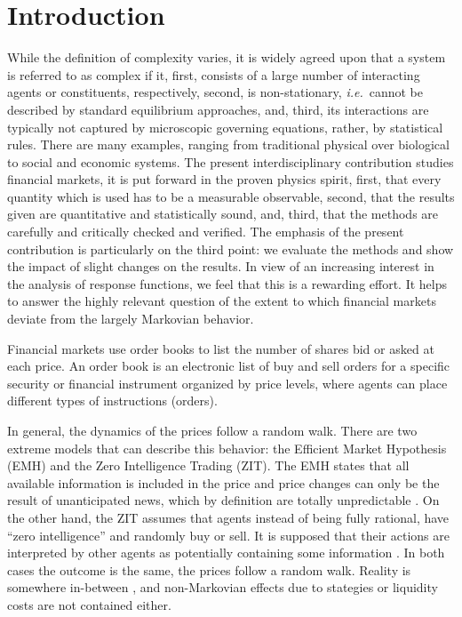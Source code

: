 \section{Introduction}\label{sec:introduction}

While the definition of complexity varies, it is widely agreed upon that a
system is referred to as complex if it, first, consists of a large number of
interacting agents or constituents, respectively, second, is non-stationary,
\textit{i.e.}~cannot be described by standard equilibrium approaches, and,
third, its interactions are typically not captured by microscopic governing
equations, rather, by statistical rules. There are many examples, ranging from
traditional physical over biological to social and economic systems. The
present interdisciplinary contribution studies financial markets, it is put
forward in the proven physics spirit, first, that every quantity which is used
has to be a measurable observable, second, that the results given are
quantitative and statistically sound, and, third, that the methods are
carefully and critically checked and verified. The emphasis of the present
contribution is particularly on the third point: we evaluate the methods and
show the impact of slight changes on the results. In view of an increasing
interest in the analysis of response functions, we feel that this is a
rewarding effort. It helps to answer the highly relevant question of the extent
to which financial markets deviate from the largely Markovian behavior.

Financial markets use order books to list the number of shares bid or asked at
each price. An order book is an electronic list of buy and sell orders for a
specific security or financial instrument organized by price levels, where
agents can place different types of instructions (orders).

In general, the dynamics of the prices follow a random walk. There are two
extreme models that can describe this behavior: the Efficient Market Hypothesis
(EMH) and the Zero Intelligence Trading (ZIT). The EMH states that all
available information is included in the price and price changes can only be
the result of unanticipated news, which by definition are totally unpredictable
\cite{subtle_nature,Bouchaud_2004,EMH_lillo,stat_theory}. On the other hand,
the ZIT assumes that agents instead of being fully rational, have ``zero
intelligence” and randomly buy or sell. It is supposed that their actions are
interpreted by other agents as potentially containing some information
\cite{subtle_nature,Bouchaud_2004,stat_theory,Wang_2016_cross}.
In both cases the outcome is the same, the prices follow a random walk. Reality
is somewhere in-between \cite{Bouchaud_2004,stat_theory}, and non-Markovian
effects due to stategies or liquidity costs are not contained either.

